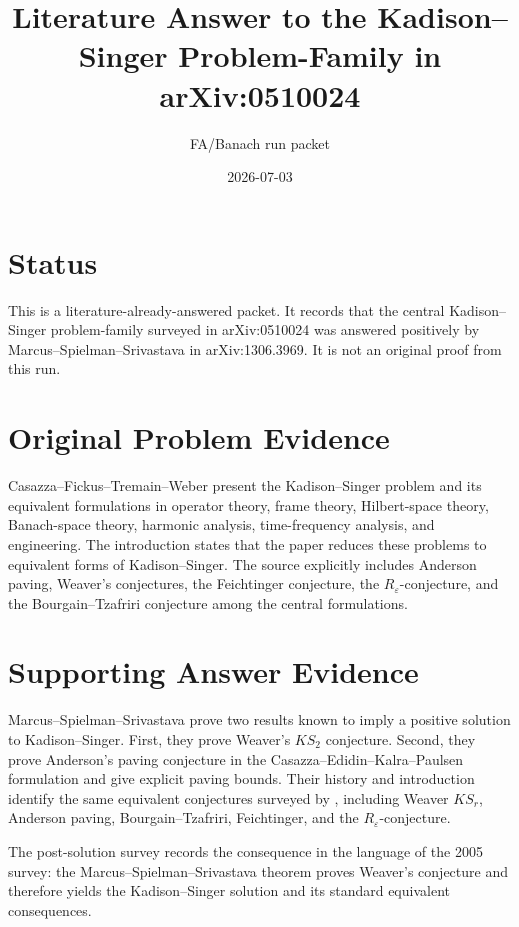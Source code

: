 \documentclass[11pt]{article}
\title{Literature Answer to the Kadison--Singer Problem-Family in arXiv:0510024}
\author{FA/Banach run packet}
\date{2026-07-03}
\begin{document}
\maketitle

\section*{Status}

This is a literature-already-answered packet. It records that the central
Kadison--Singer problem-family surveyed in arXiv:0510024 was answered
positively by Marcus--Spielman--Srivastava in arXiv:1306.3969. It is not an
original proof from this run.

\section*{Original Problem Evidence}

Casazza--Fickus--Tremain--Weber \cite{CFTW} present the Kadison--Singer
problem and its equivalent formulations in operator theory, frame theory,
Hilbert-space theory, Banach-space theory, harmonic analysis,
time-frequency analysis, and engineering. The introduction states that the
paper reduces these problems to equivalent forms of Kadison--Singer. The
source explicitly includes Anderson paving, Weaver's conjectures, the
Feichtinger conjecture, the \(R_\varepsilon\)-conjecture, and the
Bourgain--Tzafriri conjecture among the central formulations.

\section*{Supporting Answer Evidence}

Marcus--Spielman--Srivastava \cite{MSS} prove two results known to imply a
positive solution to Kadison--Singer. First, they prove Weaver's
\(KS_2\) conjecture. Second, they prove Anderson's paving conjecture in the
Casazza--Edidin--Kalra--Paulsen formulation and give explicit paving bounds.
Their history and introduction identify the same equivalent conjectures
surveyed by \cite{CFTW}, including Weaver \(KS_r\), Anderson paving,
Bourgain--Tzafriri, Feichtinger, and the \(R_\varepsilon\)-conjecture.

The post-solution survey \cite{C2014} records the consequence in the language
of the 2005 survey: the Marcus--Spielman--Srivastava theorem proves Weaver's
conjecture and therefore yields the Kadison--Singer solution and its standard
equivalent consequences.
\end{document}
